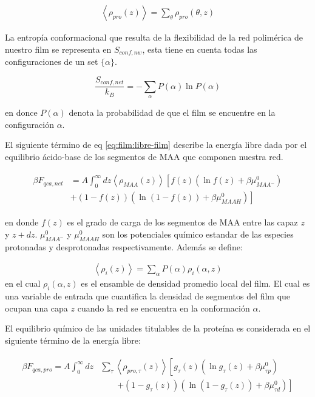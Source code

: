 \begin{align}
	\left<\rho_{pro}(z)\right> = \sum_\theta{\rho_{pro}(\theta,z)}
\end{align}


La entrop\'ia conformacional que resulta de la flexibilidad de la red polim\'erica de nuestro film se representa en $S_{conf, nw}$, esta tiene en cuenta todas las configuraciones de un set $\{\alpha\}$.

\begin{equation}
	\frac{S_{conf,net}}{k_B} = - \sum_{\alpha}{P(\alpha)\ln P(\alpha)}
\end{equation}

\noindent en donce $P(\alpha)$ denota la probabilidad de que el film se encuentre en la configuraci\'on $\alpha$.

El siguiente t\'ermino de eq \ref{eq:film:libre-film} describe  la energ\'ia libre dada por  el equilibrio \'acido-base de los segmentos de MAA que componen nuestra red. 

\begin{align}
	\begin{aligned}
		\beta F_{qca,net} &= A\int_0^\infty dz \left<\rho_{MAA}(z)\right> \left[f(z)(\ln f(z)+ \beta\mu^0_{MAA^-})\right.\\
		&\left.+(1-f(z))(\ln (1-f(z))+\beta\mu^0_{MAAH})\right]    
	\end{aligned}
\end{align} 

\noindent en donde $f(z)$ es el grado de carga de los segmentos de MAA entre las capaz $z$ y $z + dz$. 
$\mu^0_{MAA^-}$ y $\mu^0_{MAAH}$ son los potenciales qu\'imico estandar  de las especies protonadas y desprotonadas respectivamente.
Adem\'as se define:

\begin{align}
	\left< \rho_i(z)\right> = \sum_\alpha{P(\alpha)\rho_i(\alpha,z)}
\end{align}
\noindent en el cual $\rho_i(\alpha,z)$  es el ensamble de densidad  promedio local del film. El cual es una variable de entrada que cuantifica la densidad de segmentos del film que  ocupan una capa $z$ cuando la red se encuentra en la conformaci\'on $\alpha$.


El equilibrio qu\'imico de las unidades titulables de la prote\'ina es considerada en el siguiente t\'ermino de la energ\'ia libre:

\begin{align}
	\begin{aligned}
		\beta F_{qca,pro} = A\int_0^\infty dz& \sum_\tau \left<\rho_{pro,\tau}(z)\right> \left[g_\tau(z)(\ln g_\tau(z)+ \beta\mu^0_{\tau p})\right.\\
		&\qquad\left.+(1-g_\tau(z))(\ln (1-g_\tau(z))+\beta\mu^0_{\tau d})\right]   
	\end{aligned}
\end{align} 

